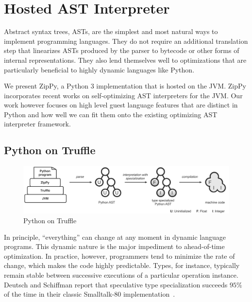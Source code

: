 \chapter{Hosted AST Interpreter}

Abstract syntax trees, ASTs, are the simplest and most natural ways to implement programming languages.
They do not require an additional translation step that linearizes ASTs produced by the parser to bytecode or other forms of internal representations.
They also lend themselves well to optimizations that are particularly beneficial to highly dynamic languages like Python.

We present ZipPy, a Python 3 implementation that is hosted on the JVM.
ZipPy incorporates recent works on self-optimizing AST interpreters for the JVM.
Our work however focuses on high level guest language features that are distinct in Python and
how well we can fit them onto the existing optimizing AST interpreter framework.

\section{Python on Truffle}

\begin{figure}[t]
\centering
\includegraphics[scale=.6]{figures/ch3-python-on-truffle.pdf}
\caption{Python on Truffle}
\label{fig:python-on-truffle}
\end{figure}

In principle, ``everything'' can change at any moment in dynamic language programs.
This dynamic nature is the major impediment to ahead-of-time optimization.
In practice, however, programmers tend to minimize the rate of change, which makes the code highly predictable.
Types, for instance, typically remain stable between successive executions of a particular operation instance.
Deutsch and Schiffman report that speculative type specialization succeeds $95\%$ of the time in their classic Smalltalk-80 implementation~\cite{Deutsch1984}.

